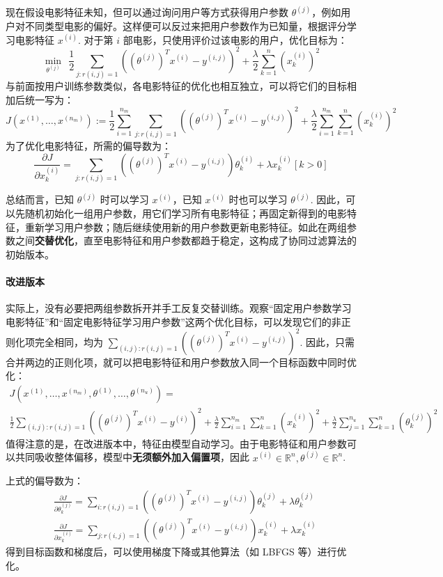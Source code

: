 现在假设电影特征未知，但可以通过询问用户等方式获得用户参数 $\theta^{(j)}$，例如用户对不同类型电影的偏好。这样便可以反过来把用户参数作为已知量，根据评分学习电影特征 $x^{(i)}$. 对于第 $i$ 部电影，只使用评价过该电影的用户，优化目标为：
\[
\min_{\theta^{(j)}}~~\frac{1}{2}\sum_{j:r(i,j)=1}\left((\theta^{(j)})^Tx^{(i)}-y^{(i,j)}\right)^2+\frac{\lambda}{2}\sum_{k=1}^{n}(x_k^{(i)})^2
\]
与前面按用户训练参数类似，各电影特征的优化也相互独立，可以将它们的目标相加后统一写为：
\[
J(x^{(1)},\ldots,x^{(n_m)}):=\frac{1}{2}\sum_{i=1}^{n_m}\sum_{j:r(i,j)=1}\left((\theta^{(j)})^Tx^{(i)}-y^{(i,j)}\right)^2+\frac{\lambda}{2}\sum_{i=1}^{n_m}\sum_{k=1}^{n}(x_k^{(i)})^2
\]
为了优化电影特征，所需的偏导数为：
\[
\frac{\partial J}{\partial x^{(i)}_k}=\sum_{j:r(i,j)=1}\left((\theta^{(j)})^Tx^{(i)}-y^{(i,j)}\right)\theta^{(i)}_k+\lambda x_k^{(i)}[k>0]
\]

总结而言，已知 $\theta^{(j)}$ 时可以学习 $x^{(i)}$，已知 $x^{(i)}$ 时也可以学习 $\theta^{(j)}$. 因此，可以先随机初始化一组用户参数，用它们学习所有电影特征；再固定新得到的电影特征，重新学习用户参数；随后继续使用新的用户参数更新电影特征。如此在两组参数之间\textbf{交替优化}，直至电影特征和用户参数都趋于稳定，这构成了协同过滤算法的初始版本。


\paragraph{改进版本}

实际上，没有必要把两组参数拆开并手工反复交替训练。观察“固定用户参数学习电影特征”和“固定电影特征学习用户参数”这两个优化目标，可以发现它们的非正则化项完全相同，均为 $\sum_{(i,j):r(i,j)=1}\left((\theta^{(j)})^Tx^{(i)}-y^{(i,j)}\right)^2$. 因此，只需合并两边的正则化项，就可以把电影特征和用户参数放入同一个目标函数中同时优化：
\begin{gather*}
J(x^{(1)},\ldots,x^{(n_m)},\theta^{(1)},\ldots,\theta^{(n_u)})=\\\frac{1}{2}\sum_{(i,j):r(i,j)=1}\left((\theta^{(j)})^Tx^{(i)}-y^{(i)}\right)^2+\frac{\lambda}{2}\sum_{i=1}^{n_m}\sum_{k=1}^n(x^{(i)}_k)^2+\frac{\lambda}{2}\sum_{j=1}^{n_u}\sum_{k=1}^n(\theta^{(j)}_k)^2
\end{gather*}
值得注意的是，在改进版本中，特征由模型自动学习。由于电影特征和用户参数可以共同吸收整体偏移，模型中\textbf{无须额外加入偏置项}，因此 $x^{(i)}\in\mathbb R^n,\theta^{(j)}\in\mathbb R^n$.

上式的偏导数为：
\begin{align*}
&\frac{\partial J}{\partial\theta^{(j)}_k}=\sum_{i:r(i,j)=1}\left((\theta^{(j)})^Tx^{(i)}-y^{(i,j)}\right)\theta^{(j)}_k+\lambda\theta_k^{(j)}\\
&\frac{\partial J}{\partial x^{(i)}_k}=\sum_{j:r(i,j)=1}\left((\theta^{(j)})^Tx^{(i)}-y^{(i,j)}\right)x^{(i)}_k+\lambda x_k^{(i)}
\end{align*}
得到目标函数和梯度后，可以使用梯度下降或其他算法（如 LBFGS 等）进行优化。


